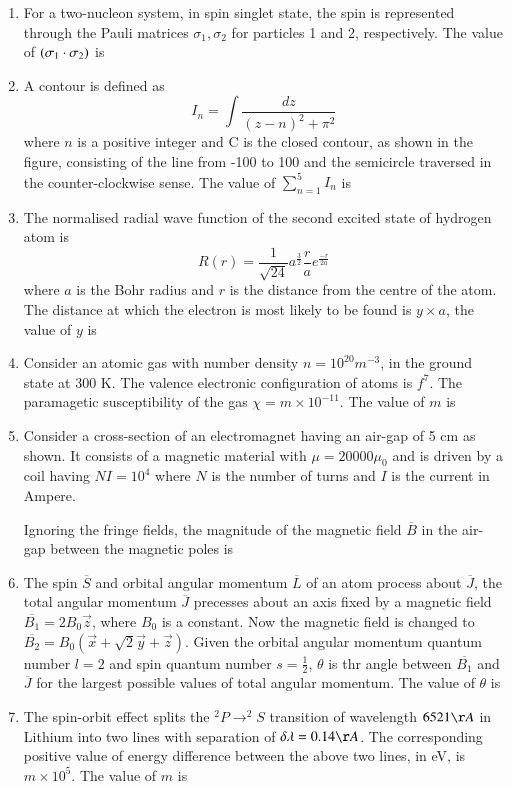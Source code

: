 \documentclass[journal]{IEEEtran}
\begin{document}
\begin{enumerate}
	\item For a two-nucleon system, in spin singlet state, the spin is represented through the Pauli matrices $\sigma_1, \sigma_2$ for particles 1 and 2, respectively. The value of $\left(\sigma_1 \cdot \sigma_2\right)$ is
	\item A contour is defined as 
		$$ I_n = \int \frac{dz}{(z-n)^2 + \pi^2} $$
		where $n$ is a positive integer and C is the closed contour, as shown in the figure, consisting of the line from -100 to 100 and the semicircle traversed in the counter-clockwise sense. The value of $\sum_{n=1}^{5} I_n $ is
		\begin{figure}[H]
			\centering
			
			\label{25}
		\end{figure}
	\item The normalised radial wave function of the second excited state of hydrogen atom is 
		$$ R(r) = \frac{1}{\sqrt{24}} a^{\frac{3}{2}} \frac{r}{a} e^{\frac{-r}{2a}} $$
		where $a$ is the Bohr radius and $r$ is the distance from the centre of the atom. The distance at which the electron is most likely to be found is $y \times a$, the value of $y$ is
	\item Consider an atomic gas with number density $n = 10^{20} m^{-3} $, in the ground state at 300 K. The valence electronic configuration of atoms is $f^7$. The paramagetic susceptibility of the gas $\chi = m \times 10^{-11}$. The value of $m$ is
	\item Consider a cross-section of an electromagnet having an air-gap of 5 cm as shown. It consists of a magnetic material with $\mu = 20000 \mu_0$ and is driven by a coil having $NI = 10^4$ where $N$ is the number of turns and $I$ is the current in Ampere.
		\begin{figure}[H]
			\centering
			
			\label{25}
		\end{figure}
		Ignoring the fringe fields, the magnitude of the magnetic field $\overline{B}$ in the air-gap between the magnetic poles is
	\item The spin $\overline{S}$ and orbital angular momentum $\overline{L}$ of an atom process about $\overline{J}$, the total angular momentum $\overline{J}$ precesses about an axis fixed by a magnetic field $\overline{B_1} = 2B_0 \vec{z}$, where $B_0$ is a constant. Now the magnetic field is changed to $\overline{B_2} = B_0 ( \vec{x} + \sqrt{2} \vec{y} + \vec{z})$. Given the orbital angular momentum quantum number $l=2$ and spin quantum number $s = \frac{1}{2}$, $\theta$ is thr angle between $\overline{B_1}$ and $\overline{J}$ for the largest possible values of total angular momentum. The value of $\theta$ is
	\item The spin-orbit effect splits the $^{2} P \to ^{2} S$ transition of wavelength $6521 \AA$ in Lithium into two lines with separation of $\delta \lambda = 0.14 \AA$. The corresponding positive value of energy difference between the above two lines, in eV, is $m \times 10^5$. The value of $m$ is
\end{enumerate}
\end{document}
